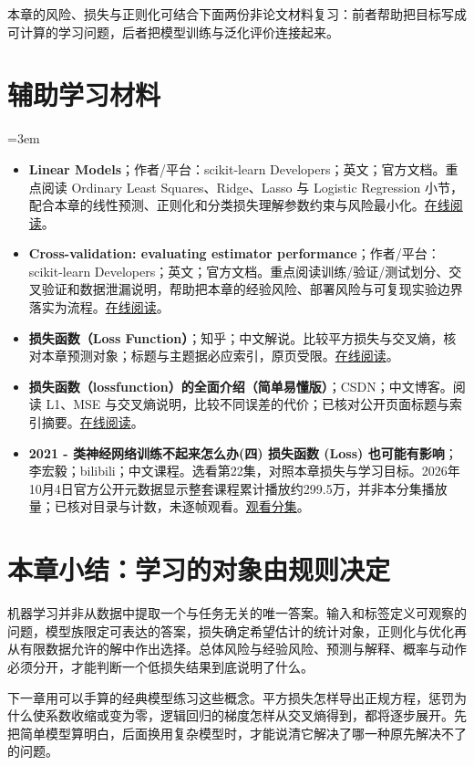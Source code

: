 本章的风险、损失与正则化可结合下面两份非论文材料复习：前者帮助把目标写成可计算的学习问题，后者把模型训练与泛化评价连接起来。
\section*{辅助学习材料}
\begingroup
\emergencystretch=3em
\begin{itemize}
\item \textbf{Linear Models}；作者/平台：scikit-learn Developers；英文；官方文档。重点阅读 Ordinary Least Squares、Ridge、Lasso 与 Logistic Regression 小节，配合本章的线性预测、正则化和分类损失理解参数约束与风险最小化。\href{https://scikit-learn.org/stable/modules/linear\_model.html}{在线阅读}。
\item \textbf{Cross-validation: evaluating estimator performance}；作者/平台：scikit-learn Developers；英文；官方文档。重点阅读训练/验证/测试划分、交叉验证和数据泄漏说明，帮助把本章的经验风险、部署风险与可复现实验边界落实为流程。\href{https://scikit-learn.org/stable/modules/cross\_validation.html}{在线阅读}。
\item \textbf{损失函数（Loss Function）}；知乎；中文解说。比较平方损失与交叉熵，核对本章预测对象；标题与主题据必应索引，原页受限。\href{https://zhuanlan.zhihu.com/p/261059231}{在线阅读}。
\item \textbf{损失函数（lossfunction）的全面介绍（简单易懂版）}；CSDN；中文博客。阅读 L1、MSE 与交叉熵说明，比较不同误差的代价；已核对公开页面标题与索引摘要。\href{https://blog.csdn.net/weixin\_57643648/article/details/122704657}{在线阅读}。
\item \textbf{2021 - 类神经网络训练不起来怎么办(四) 损失函数 (Loss) 也可能有影响}；李宏毅；bilibili；中文课程。选看第22集，对照本章损失与学习目标。2026年10月4日官方公开元数据显示整套课程累计播放约299.5万，并非本分集播放量；已核对目录与计数，未逐帧观看。\href{https://www.bilibili.com/video/BV1Wv411h7kN/?p=22}{观看分集}。
\end{itemize}
\endgroup
\section{本章小结：学习的对象由规则决定}
机器学习并非从数据中提取一个与任务无关的唯一答案。输入和标签定义可观察的问题，模型族限定可表达的答案，损失确定希望估计的统计对象，正则化与优化再从有限数据允许的解中作出选择。总体风险与经验风险、预测与解释、概率与动作必须分开，才能判断一个低损失结果到底说明了什么。

下一章用可以手算的经典模型练习这些概念。平方损失怎样导出正规方程，惩罚为什么使系数收缩或变为零，逻辑回归的梯度怎样从交叉熵得到，都将逐步展开。先把简单模型算明白，后面换用复杂模型时，才能说清它解决了哪一种原先解决不了的问题。
